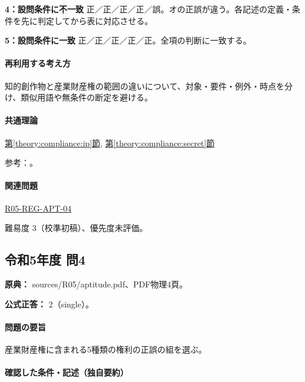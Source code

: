 \noindent\textbf{4：設問条件に不一致} 正／正／正／正／誤。オの正誤が違う。各記述の定義・条件を先に判定してから表に対応させる。\par

\noindent\textbf{5：設問条件に一致} 正／正／正／正／正。全項の判断に一致する。\par

\paragraph{再利用する考え方} 知的創作物と産業財産権の範囲の違いについて、対象・要件・例外・時点を分け、類似用語や無条件の断定を避ける。

\paragraph{共通理論} \hyperref[theory:compliance:ip]{第\ref*{theory:compliance:ip}節}, \hyperref[theory:compliance:secret]{第\ref*{theory:compliance:secret}節}

\par 参考：\cite{ip_basic_act,jpo_ip_overview,meti_trade_secret}。

\paragraph{関連問題} \hyperref[q:r05-reg-apt-04]{R05-REG-APT-04}

\par 難易度 3（校準初稿）、優先度未評価。

\subsection{令和5年度 問4}
\label{q:r05-reg-apt-04}

\noindent\textbf{原典：} sources/R05/aptitude.pdf、PDF物理4頁。

\textbf{公式正答：} 2（single）。

\paragraph{問題の要旨} 産業財産権に含まれる5種類の権利の正誤の組を選ぶ。

\paragraph{確認した条件・記述（独自要約）}\mbox{}\par

